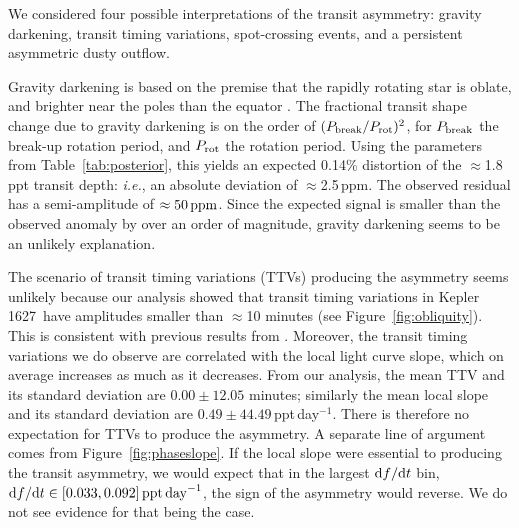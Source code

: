 \documentclass[12pt,modern,twocolumn,tighten]{aastex63}
\newcommand{\sn}{Kepler\,1627} %
\begin{document}
We considered four possible interpretations of the transit asymmetry:
gravity darkening, transit timing variations, spot-crossing events,
and a persistent asymmetric dusty outflow.  

Gravity darkening is based on the premise that the rapidly rotating
star is oblate, and brighter near the poles than the equator
\citep[{\it e.g.},][]{masuda_spin-orbit_2015}.  The fractional transit
shape change due to gravity darkening is on the order of $(P_{\rm
break}/P_{\rm rot})^2$, for $P_{\rm break}$ the break-up rotation
period, and $P_{\rm rot}$ the rotation period.  Using the parameters
from Table~\ref{tab:posterior}, this yields an expected 0.14\%
distortion of the $\approx$1.8\,ppt transit depth: {\it i.e.}, an
absolute deviation of $\approx$2.5\,ppm.  The observed residual has a
semi-amplitude of $\approx 50\,{\rm ppm}$.  Since the expected signal
is smaller than the observed anomaly by over an order of magnitude,
gravity darkening seems to be an unlikely explanation.

The scenario of transit timing variations (TTVs) producing the
asymmetry seems unlikely because our analysis showed that transit
timing variations in \sn\ have amplitudes smaller than $\approx$10
minutes (see Figure~\ref{fig:obliquity}).  This is consistent with
previous results from \citet{holczer_transit_2016}.  Moreover, the
transit timing variations we do observe are correlated with the local
light curve slope, which on average increases as much as it decreases.
From our analysis, the mean TTV and its standard deviation are
$0.00\pm12.05$ minutes; similarly the mean local slope and its
standard deviation are $0.49\pm44.49$\,ppt\,day$^{-1}$.  There is
therefore no expectation for TTVs to produce the asymmetry.  A
separate line of argument comes from Figure~\ref{fig:phaseslope}.  If
the local slope were essential to producing the transit asymmetry, we
would expect that in the largest ${\rm d}f/{\rm d}t$ bin, ${\rm
d}f/{\rm d}t\in[0.033,0.092]\,{\rm ppt\,day}^{-1}$, the sign of the
asymmetry would reverse.  We do not see evidence for that being the
case.
\end{document}
